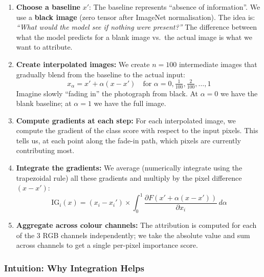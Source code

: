 \documentclass[12pt, a4paper]{article}
\begin{document}
\begin{enumerate}[leftmargin=*]
    \item \textbf{Choose a baseline} $x'$:  The baseline represents ``absence
          of information''.  We use a \textbf{black image} (zero tensor after
          ImageNet normalisation).  The idea is: \emph{``What would the model
          see if nothing were present?''}  The difference between what the
          model predicts for a blank image vs.\ the actual image is what we
          want to attribute.

    \item \textbf{Create interpolated images:}  We create $n = 100$
          intermediate images that gradually blend from the baseline to the
          actual input:
          \[
          x_\alpha = x' + \alpha(x - x') \quad
          \text{for } \alpha = 0, \tfrac{1}{100}, \tfrac{2}{100}, \ldots, 1
          \]
          Imagine slowly ``fading in'' the photograph from black.  At
          $\alpha = 0$ we have the blank baseline; at $\alpha = 1$ we have
          the full image.

    \item \textbf{Compute gradients at each step:}  For each interpolated
          image, we compute the gradient of the class score with respect to
          the input pixels.  This tells us, at each point along the fade-in
          path, which pixels are currently contributing most.

    \item \textbf{Integrate the gradients:}  We average (numerically integrate
          using the trapezoidal rule) all these gradients and multiply by the
          pixel difference $(x - x')$:
          \begin{equation}
          \text{IG}_i(x) = (x_i - x_i') \times \int_0^1
          \frac{\partial F(x' + \alpha(x - x'))}{\partial x_i} \, d\alpha
          \end{equation}

    \item \textbf{Aggregate across colour channels:}  The attribution is
          computed for each of the 3 RGB channels independently; we take the
          absolute value and sum across channels to get a single per-pixel
          importance score.
\end{enumerate}

\subsubsection{Intuition: Why Integration Helps}
\end{document}
